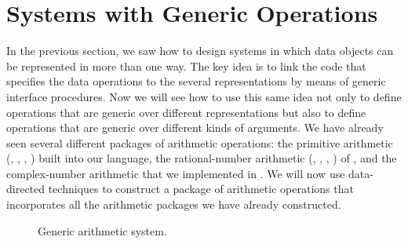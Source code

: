 \section{Systems with Generic Operations}
\label{Section 2.5}

In the previous section, we saw how to design systems in which data objects can
be represented in more than one way.  The key idea is to link the code that
specifies the data operations to the several representations by means of
generic interface procedures.  Now we will see how to use this same idea not
only to define operations that are generic over different representations but
also to define operations that are generic over different kinds of arguments.
We have already seen several different packages of arithmetic operations: the
primitive arithmetic (\code{+}, \code{-}, \code{*}, \code{/}) built into our
language, the rational-number arithmetic (, ,
, ) of , and the complex-number
arithmetic that we implemented in .  We will now use
data-directed techniques to construct a package of arithmetic operations that
incorporates all the arithmetic packages we have already constructed.

\begin{figure}[tb]
\label{Figure 2.23}
\centering
\begin{comment}
\label{Figure 2.23}
\heading{Figure 2.23:} Generic arithmetic system.

\begin{example}
                        Programs that use numbers
                           +-----------------+
---------------------------| add sub mul div |-------------------
                           +-----------------+
                        Generic arithmetic package
 +-----------------+   +-------------------------+
 | add-rat sub-rat |   | add-complex sub-complex |   +---------+
-|                 |-+-|                         |-+-| + - * / |-
 | mul-rat div-rat | | | mul-complex div-complex | | +---------+
 +-----------------+ | +-------------------------+ |
      Rational       |     Complex artithmetic     |   Ordinary
     arithmetic      +--------------+--------------+  arithmetic
                     | Rectangular  |     Polar    |
---------------------+--------------+--------------+-------------
             List structure and primitive machine arithmetic
\end{example}
\end{comment}

\par\bigskip
\noindent
{} Generic arithmetic system.
\end{figure}

